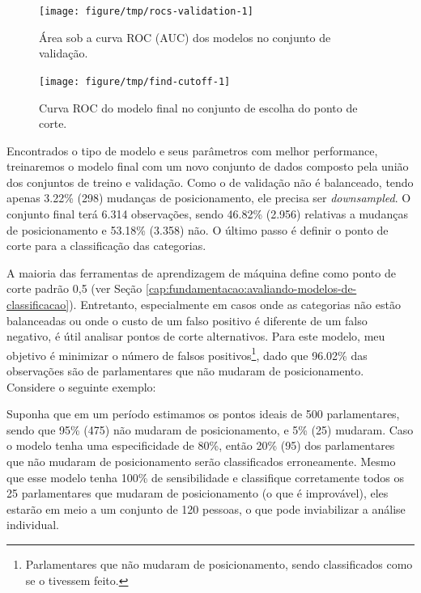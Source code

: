 \documentclass[a4paper,titlepage]{ppgi}\usepackage[]{graphicx}\usepackage[]{color}
\newenvironment{knitrout}{}{} %
\begin{document}
\begin{knitrout}
\color{fgcolor}\begin{figure}
\texttt{[image: figure/tmp/rocs-validation-1]} \caption[Área sob a curva ROC (AUC) dos modelos no conjunto de validação]{Área sob a curva ROC (AUC) dos modelos no conjunto de validação.}\label{fig:rocs-validation}
\end{figure}


\end{knitrout}



\begin{knitrout}
\color{fgcolor}\begin{figure}
\texttt{[image: figure/tmp/find-cutoff-1]} \caption[Curva ROC do modelo final no conjunto de escolha do ponto de corte]{Curva ROC do modelo final no conjunto de escolha do ponto de corte.}\label{fig:find-cutoff}
\end{figure}


\end{knitrout}

Encontrados o tipo de modelo e seus parâmetros com melhor performance,
treinaremos o modelo final com um novo conjunto de dados composto pela união
dos conjuntos de treino e validação. Como o de validação não é balanceado,
tendo apenas 3.22\%
(298) mudanças de
posicionamento, ele precisa ser \emph{downsampled}. O conjunto final terá
6.314 observações, sendo
46.82\%
(2.956) relativas a
mudanças de posicionamento e
53.18\%
(3.358) não. O último
passo é definir o ponto de corte para a classificação das categorias.

A maioria das ferramentas de aprendizagem de máquina define como ponto de
corte padrão 0,5 (ver Seção
\ref{cap:fundamentacao:avaliando-modelos-de-classificacao}). Entretanto,
especialmente em casos onde as categorias não estão balanceadas ou onde o custo
de um falso positivo é diferente de um falso negativo, é útil analisar pontos
de corte alternativos. Para este modelo, meu objetivo é minimizar o número de
falsos positivos\footnote{Parlamentares que não mudaram de posicionamento,
sendo classificados como se o tivessem feito.}, dado que
96.02\% das observações são de
parlamentares que não mudaram de posicionamento. Considere o seguinte exemplo:

Suponha que em um período estimamos os pontos ideais de 500 parlamentares,
sendo que 95\% (475) não mudaram de posicionamento, e 5\% (25) mudaram. Caso o
modelo tenha uma especificidade de 80\%, então 20\% (95) dos parlamentares que
não mudaram de posicionamento serão classificados erroneamente. Mesmo que esse
modelo tenha 100\% de sensibilidade e classifique corretamente todos os 25
parlamentares que mudaram de posicionamento (o que é improvável), eles estarão
em meio a um conjunto de 120 pessoas, o que pode inviabilizar a análise
individual.
\end{document}
